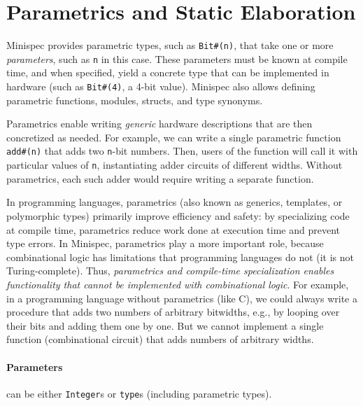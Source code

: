 \section{Parametrics and Static Elaboration}
\label{sec:parametrics}

Minispec provides parametric types, such as \texttt{Bit\#(n)},
that take one or more \emph{parameters}, such as \texttt{n} in this case.
These parameters must be known at compile time, and when specified,
yield a concrete type that can be implemented in hardware (such as \texttt{Bit\#(4)}, a 4-bit value).
Minispec also allows defining parametric functions, modules, structs, and type synonyms.

Parametrics enable writing \emph{generic} hardware descriptions
that are then concretized as needed. For example,
we can write a single parametric function \texttt{add\#(n)}
that adds two \texttt{n}-bit numbers.
Then, users of the function will call it with particular values of \texttt{n},
instantiating adder circuits of different widths.
Without parametrics, each such adder would require writing a separate function.

In programming languages, parametrics (also known as generics, templates, or polymorphic types)
primarily improve efficiency and safety: by specializing code at compile time,
parametrics reduce work done at execution time and prevent type errors.
In Minispec, parametrics play a more important role,
because combinational logic has limitations that programming languages do not (it is not Turing-complete).
Thus, \emph{parametrics and compile-time specialization enables functionality that cannot be implemented with combinational logic}.
For example, in a programming language without parametrics (like C),
we could always write a procedure that adds two numbers of arbitrary bitwidths,
e.g., by looping over their bits and adding them one by one.
But we cannot implement a single function (combinational circuit)
that adds numbers of arbitrary widths.


\paragraph{Parameters} can be either \texttt{Integer}s or \texttt{type}s (including parametric types).

